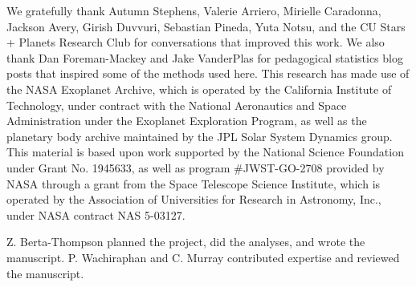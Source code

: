 \documentclass[modern,linenumbers,trackchanges]{aastex7}
\begin{document}
\begin{acknowledgments}
We gratefully thank Autumn Stephens, Valerie Arriero, Mirielle Caradonna, Jackson Avery, Girish Duvvuri, Sebastian Pineda, Yuta Notsu, and the CU Stars + Planets Research Club for conversations that improved this work. We also thank Dan Foreman-Mackey and Jake VanderPlas for pedagogical statistics blog posts that inspired some of the methods used here. This research has made use of the NASA Exoplanet Archive, which is operated by the California Institute of Technology, under contract with the National Aeronautics and Space Administration under the Exoplanet Exploration Program, as well as the planetary body archive maintained by the JPL Solar System Dynamics group. This material is based upon work supported by the National Science Foundation under Grant No. 1945633, as well as  program \#JWST-GO-2708 provided by NASA through a grant from the Space Telescope Science Institute, which is operated by the Association of Universities for Research in Astronomy, Inc., under NASA contract NAS 5-03127. 
\end{acknowledgments}

\begin{contribution}
Z. Berta-Thompson planned the project, did the analyses, and wrote the manuscript. P. Wachiraphan and C. Murray contributed expertise and reviewed the manuscript.

\end{contribution}





{}



\end{document}

